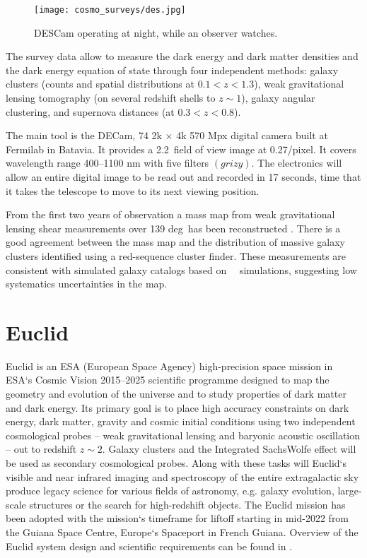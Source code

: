 \begin{figure}[ht]
    \centering
    \texttt{[image: cosmo\_surveys/des.jpg]}
    \caption{DESCam operating at night, while an observer watches.}
    \label{fig:des}
\end{figure}
The survey data allow to measure the dark energy and dark matter densities and the dark energy equation of state through four independent methods: galaxy clusters (counts and spatial distributions at $0.1<z<1.3$), weak gravitational lensing tomography (on several redshift shells to $z\sim1$), galaxy angular clustering, and supernova distances (at $0.3<z<0.8$).

The main tool is the DECam, 74 2k $\times$ 4k 570 Mpx digital camera built at Fermilab in Batavia. It provides a 2.2\textdegree\ field of view image at 0.27\arcsec/pixel. It covers wavelength range 400--1100 nm with five filters $(grizy)$. The electronics will allow an entire digital image to be read out and recorded in 17 seconds, time that it takes the telescope to move to its next viewing position.

From the first two years of observation a mass map from weak gravitational lensing shear measurements over 139 deg\sq\ has been reconstructed \cite{DES_mass}. There is a good agreement between the mass map and the distribution of massive galaxy clusters identified using a red-sequence cluster finder. These measurements are consistent with simulated galaxy catalogs based on \LCDM\ \nbody\ simulations, suggesting low systematics uncertainties in the map.

\section{Euclid}
Euclid is an ESA (European Space Agency) high-precision space mission in ESA`s Cosmic Vision 2015--2025 scientific programme designed to map the geometry and evolution of the universe and to study properties of dark matter and dark energy. Its primary goal is to place high accuracy constraints on dark energy, dark matter, gravity and cosmic initial conditions using two independent cosmological probes -- weak gravitational lensing and baryonic acoustic oscillation -- out to redshift $z\sim2$. Galaxy clusters and the Integrated SachsWolfe effect will be used as secondary cosmological probes. Along with these tasks will Euclid`s visible and near infrared imaging and spectroscopy of the entire extragalactic sky produce legacy science for various fields of astronomy, e.g. galaxy evolution, large-scale structures or the search for high-redshift objects. The Euclid mission has been adopted with the mission`s timeframe for liftoff starting in mid-2022 from the Guiana Space Centre, Europe`s Spaceport in French Guiana. Overview of the Euclid system design and scientific requirements can be found in \cite{2011arXiv1110.3193L}.

